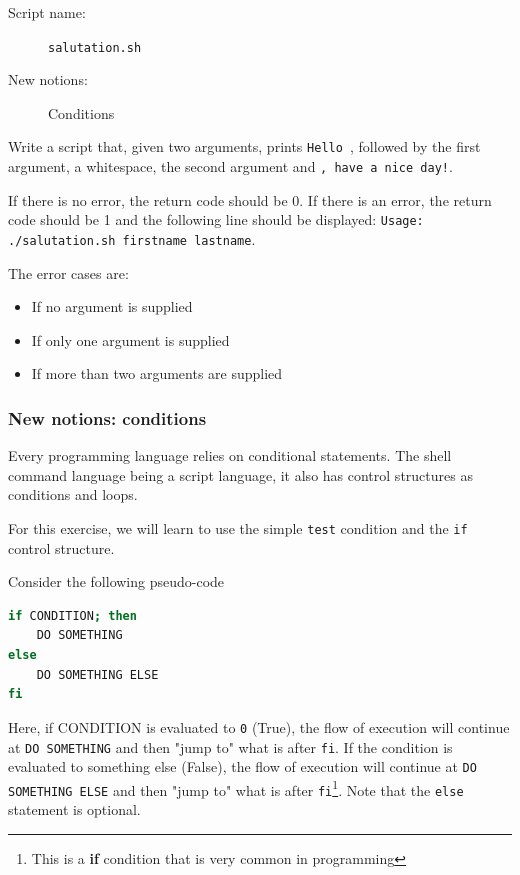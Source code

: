 \documentclass[12pt]{article}
\begin{document}
\begin{description}
    \item[Script name:] \texttt{salutation.sh}
    \item[New notions:] Conditions
\end{description}

Write a script that, given two arguments, prints \texttt{Hello }, followed by the first argument, a whitespace, the second argument and \texttt{, have a nice day!}.

If there is no error, the return code should be 0. If there is an error, the return code should be 1 and the following line should be displayed: \texttt{Usage: ./salutation.sh firstname lastname}.

The error cases are:

\begin{itemize}
        \item If no argument is supplied
        \item If only one argument is supplied
        \item If more than two arguments are supplied
\end{itemize}

\subsubsection{New notions: conditions}

Every programming language relies on conditional statements. The shell command language being a script language, it also has control structures as conditions and loops.

For this exercise, we will learn to use the simple \texttt{test} condition and the \texttt{if} control structure.

Consider the following pseudo-code

\begin{lstlisting}[language=bash]
if CONDITION; then
	DO SOMETHING
else
	DO SOMETHING ELSE
fi
\end{lstlisting}

Here, if CONDITION is evaluated to \texttt{0} (True), the flow of execution will continue at \texttt{DO SOMETHING} and then "jump to" what is after \texttt{fi}. If the condition is evaluated to something else (False), the flow of execution will continue at \texttt{DO SOMETHING ELSE} and then "jump to" what is after \texttt{fi}\footnote{This is a \textbf{if} condition that is very common in programming}. Note that the \texttt{else} statement is optional.
\end{document}
